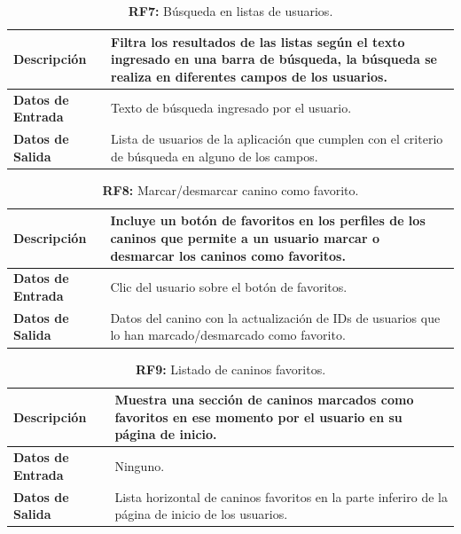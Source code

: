 \documentclass[a4paper, 12pt]{article}
\begin{document}
\begin{table}[H]
\captionsetup{list=no}%
\captionsetup{justification=raggedright,singlelinecheck=false}
\captionsetup{labelformat=empty}
\caption{\textbf{RF7:} Búsqueda en listas de usuarios.}
\label{tab:RF7}
	\begin{tabular}{|m{5cm}|m{10cm}|}
\hline
	\textbf{Descripción} & Filtra los resultados de las listas según el texto ingresado en una barra de búsqueda, la búsqueda se realiza en diferentes campos de los usuarios. \\ 
	\hline
	\textbf{Datos de Entrada} & Texto de búsqueda ingresado por el usuario. \\ 
	\hline
	\textbf{Datos de Salida} &  Lista de usuarios de la aplicación que cumplen con el criterio de búsqueda en alguno de los campos. \\ 
	\hline
\end{tabular}
\end{table}

\begin{table}[H]
\captionsetup{list=no}%
\captionsetup{justification=raggedright,singlelinecheck=false}
\captionsetup{labelformat=empty}
\caption{\textbf{RF8:} Marcar/desmarcar canino como favorito.}
\label{tab:RF8}
	\begin{tabular}{|m{5cm}|m{10cm}|}
	\hline
	\textbf{Descripción} & Incluye un botón de favoritos en los perfiles de los caninos que permite a un usuario marcar o desmarcar los caninos como favoritos. \\ 
	\hline
	\textbf{Datos de Entrada} & Clic del usuario sobre el botón de favoritos. \\ 
	\hline
	\textbf{Datos de Salida} & Datos del canino con la actualización de IDs de usuarios que lo han marcado/desmarcado como favorito.\\ 
	\hline
\end{tabular}
\end{table}

\begin{table}[H]
\captionsetup{list=no}%
\captionsetup{justification=raggedright,singlelinecheck=false}
\captionsetup{labelformat=empty}
\caption{\textbf{RF9:} Listado de caninos favoritos.}
\label{tab:RF9}
	\begin{tabular}{|m{5cm}|m{10cm}|}
	\hline
	\textbf{Descripción} & Muestra una sección de caninos marcados como favoritos en ese momento por el usuario en su página de inicio. \\ 
	\hline
	\textbf{Datos de Entrada} & Ninguno. \\ 
	\hline
	\textbf{Datos de Salida} & Lista horizontal de caninos favoritos en la parte inferiro de la página de inicio de los usuarios. \\ 
	\hline
\end{tabular}
\end{table}
\end{document}

